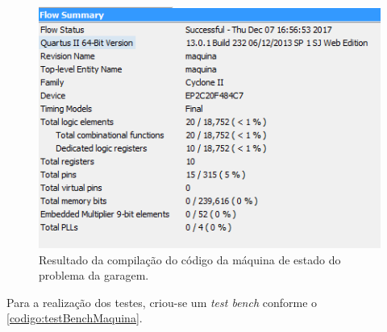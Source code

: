 		

		\begin{figure}[H]
			 \centering
			 \caption{\label{figura:compilacaoMaquina}Resultado da compilação do código da máquina de
			  estado do problema da garagem.}
			 \includegraphics[width=1\textwidth]{img/maquina/compilacao}
		\end{figure}

		Para a realização dos testes, criou-se um \textit{test bench} conforme o \autoref{codigo:testBenchMaquina}.
		





